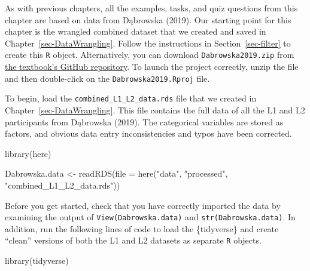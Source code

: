 \documentclass[
  letterpaper,
  DIV=11,
  numbers=noendperiod]{scrreprt}
\newenvironment{Shaded}{\begin{snugshade}}{\end{snugshade}}
\newcommand{\AttributeTok}[1]{\textcolor[rgb]{0.40,0.45,0.13}{#1}}
\newcommand{\FunctionTok}[1]{\textcolor[rgb]{0.28,0.35,0.67}{#1}}
\newcommand{\NormalTok}[1]{\textcolor[rgb]{0.00,0.23,0.31}{#1}}
\newcommand{\OtherTok}[1]{\textcolor[rgb]{0.00,0.23,0.31}{#1}}
\newcommand{\StringTok}[1]{\textcolor[rgb]{0.13,0.47,0.30}{#1}}
\begin{document}
\begin{tcolorbox}[enhanced jigsaw, arc=.35mm, bottomrule=.15mm, bottomtitle=1mm, breakable, colback=white, colbacktitle=quarto-callout-warning-color!10!white, colframe=quarto-callout-warning-color-frame, coltitle=black, left=2mm, leftrule=.75mm, opacityback=0, opacitybacktitle=0.6, rightrule=.15mm, title=\textcolor{quarto-callout-warning-color}{\faExclamationTriangle}\hspace{0.5em}{Prerequisites}, titlerule=0mm, toprule=.15mm, toptitle=1mm]

As with previous chapters, all the examples, tasks, and quiz questions
from this chapter are based on data from Dąbrowska (2019). Our starting
point for this chapter is the wrangled combined dataset that we created
and saved in Chapter~\ref{sec-DataWrangling}. Follow the instructions in
Section~\ref{sec-filter} to create this \texttt{R} object.
Alternatively, you can download \texttt{Dabrowska2019.zip} from
\href{https://github.com/elenlefoll/RstatsTextbook/blob/main/Dabrowska2019.zip}{the
textbook's GitHub repository}. To launch the project correctly, unzip
the file and then double-click on the \texttt{Dabrowska2019.Rproj} file.

To begin, load the \texttt{combined\_L1\_L2\_data.rds} file that we
created in Chapter~\ref{sec-DataWrangling}. This file contains the full
data of all the L1 and L2 participants from Dąbrowska (2019). The
categorical variables are stored as factors, and obvious data entry
inconsistencies and typos have been corrected.

\begin{Shaded}
\begin{Highlighting}[]
\FunctionTok{library}\NormalTok{(here)}

\NormalTok{Dabrowska.data }\OtherTok{\textless{}{-}} \FunctionTok{readRDS}\NormalTok{(}\AttributeTok{file =} \FunctionTok{here}\NormalTok{(}\StringTok{"data"}\NormalTok{, }\StringTok{"processed"}\NormalTok{, }\StringTok{"combined\_L1\_L2\_data.rds"}\NormalTok{))}
\end{Highlighting}
\end{Shaded}

Before you get started, check that you have correctly imported the data
by examining the output of \texttt{View(Dabrowska.data)} and
\texttt{str(Dabrowska.data)}. In addition, run the following lines of
code to load the \{tidyverse\} and create ``clean'' versions of both the
L1 and L2 datasets as separate \texttt{R} objects.

\begin{Shaded}
\begin{Highlighting}[]
\FunctionTok{library}\NormalTok{(tidyverse)}


\end{Highlighting}
\end{Shaded}
\end{tcolorbox}
\end{document}
